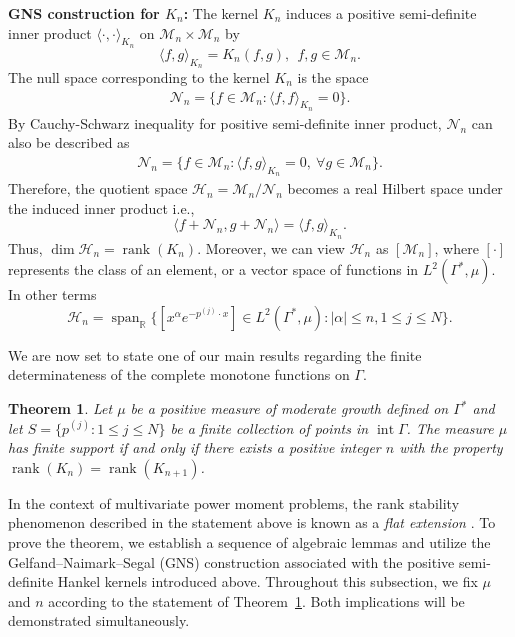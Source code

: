 \documentclass[11pt,reqno]{amsart}
\theoremstyle{plain}
\newtheorem{theorem}{Theorem}[section]
\theoremstyle{definition}
\numberwithin{equation}{section}
\begin{document}
    \noindent \textbf{GNS construction for $K_n$:}
The kernel $K_n$ induces a positive semi-definite inner product $\langle \cdot , \cdot\rangle_{K_n}$ on $\mathcal{M}_n \times \mathcal{M}_n$ by 
    $$\langle f, g \rangle_{K_n} = K_n(f, g), \ \ f, g\in \mathcal{M}_n.$$
    The null space corresponding to the kernel $K_n$ is the space
	\begin{align*}
		\mathcal{N}_n = \{f \in \mathcal{M}_n : \langle f, f\rangle_{K_n} = 0 \}.
	\end{align*}
    By Cauchy-Schwarz inequality for positive semi-definite inner product, $\mathcal{N}_n$ can also be described as 
	\begin{align*}
		\mathcal{N}_n = \{f \in \mathcal{M}_n : \langle f, g\rangle_{K_n} = 0, \ \forall g\in \mathcal{M}_n \}.
	\end{align*}
    Therefore, the quotient space $\mathcal{H}_n = \mathcal{M}_n / \mathcal{N}_n$ becomes a real Hilbert space under the induced inner product i.e., 
	$$
	\langle f+ \mathcal{N}_n, g + \mathcal{N}_n \rangle = \langle f, g \rangle_{K_n}. 
	$$
	Thus, $\operatorname{dim} \mathcal{H}_n = \operatorname{rank}(K_n)$.
	Moreover, we can view $\mathcal{H}_n$ as $[\mathcal{M}_n ]$, where $[ \cdot ]$ represents the class of an element, or a vector space of functions in $L^2(\Gamma^*, \mu)$.
	In other terms
	$$ \mathcal{H}_n  =  \operatorname{span}_{\mathbb{R}} \{[x^\alpha e^{-p^{(j)} \cdot x}]\in L^2(\Gamma^*, \mu): |\alpha| \leq n, 1\leq j \leq N \}.$$
	

    We are now set to state one of our main results regarding the finite determinateness of the complete monotone functions on $\Gamma$.
	\begin{theorem} \label{Thm-multinode-flat}
		Let $\mu$ be a positive measure of moderate growth defined on $\Gamma^\ast$ and let $S=\{ p^{(j)} : 1\leq j \leq N\}$ be a finite collection of points in $ \operatorname{int} \Gamma$. The measure $\mu$ has finite support if and only if there exists a positive integer $n$ with the property $\operatorname{rank}(K_n) = \operatorname{rank}(K_{n+1})$.
	\end{theorem}
	
	
	In the context of multivariate power moment problems, the rank stability phenomenon described in the statement above is known as a {\it flat extension} \cite{MS16}.
    To prove the theorem, we establish a sequence of algebraic lemmas and utilize the Gelfand–Naimark–Segal (GNS) construction associated with the positive semi-definite Hankel kernels introduced above. Throughout this subsection, we fix $\mu$ and $n$ according to the statement of Theorem~\ref{Thm-multinode-flat}. Both implications will be demonstrated simultaneously.
\end{document}
